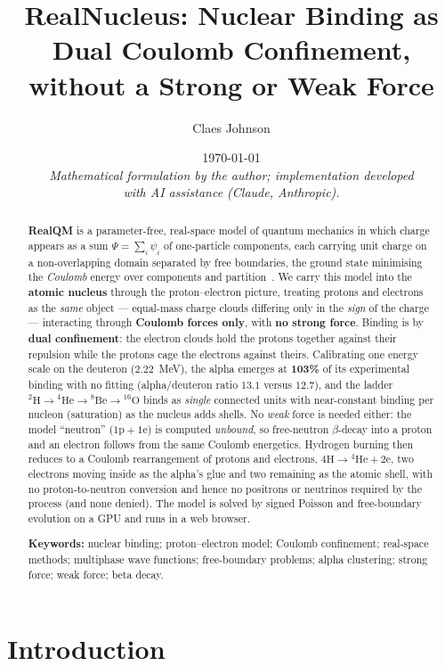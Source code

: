 \documentclass[11pt]{article}
\title{RealNucleus: Nuclear Binding as Dual Coulomb Confinement,\\ without a Strong or Weak Force}
\author[1]{Claes Johnson}
\affil[1]{KTH Royal Institute of Technology, SE-100 44 Stockholm, Sweden \\
\texttt{claesjohnson@gmail.com}}
\date{\today \\[0.4em]
\small\textit{Mathematical formulation by the author; implementation developed} \\
\small\textit{with AI assistance (Claude, Anthropic).}}
\begin{document}
\maketitle

\begin{abstract}
\textbf{RealQM} is a parameter-free, real-space model of quantum mechanics in which charge
appears as a sum $\Psi=\sum_i\psi_i$ of one-particle components, each carrying unit charge on a
non-overlapping domain separated by free boundaries, the ground state minimising the
\emph{Coulomb} energy over components and partition~\cite{Johnson-RealQM,Johnson-Book,Johnson-Atoms}.
We carry this model into the \textbf{atomic nucleus} through the proton--electron picture,
treating protons and electrons as the \emph{same} object --- equal-mass charge clouds
differing only in the \emph{sign} of the charge --- interacting through \textbf{Coulomb forces
only}, with \textbf{no strong force}. Binding is by \textbf{dual confinement}: the electron
clouds hold the protons together against their repulsion while the protons cage the electrons
against theirs. Calibrating one energy scale on the deuteron ($2.22$~MeV), the alpha emerges at
\textbf{103\%} of its experimental binding with no fitting (alpha/deuteron ratio $13.1$ versus
$12.7$), and the ladder $^2\mathrm{H}\to{}^4\mathrm{He}\to{}^8\mathrm{Be}\to{}^{16}\mathrm{O}$
binds as \emph{single} connected units with near-constant binding per nucleon (saturation) as the
nucleus adds shells. No \emph{weak} force is needed either: the model ``neutron''
($\mathrm{1p}+\mathrm{1e}$) is computed \emph{unbound}, so free-neutron $\beta$-decay into a
proton and an electron follows from the same Coulomb energetics. Hydrogen burning then reduces to
a Coulomb rearrangement of protons and electrons, $4\mathrm{H}\to{}^4\mathrm{He}+2\mathrm{e}$, two
electrons moving inside as the alpha's glue and two remaining as the atomic shell, with no
proton-to-neutron conversion and hence no positrons or neutrinos required by the process (and none
denied). The model is solved by signed
Poisson and free-boundary evolution on a GPU and runs in a web browser.

\medskip
\noindent\textbf{Keywords:} nuclear binding; proton--electron model; Coulomb confinement;
real-space methods; multiphase wave functions; free-boundary problems; alpha clustering;
strong force; weak force; beta decay.
\end{abstract}

\section{Introduction}
\end{document}
